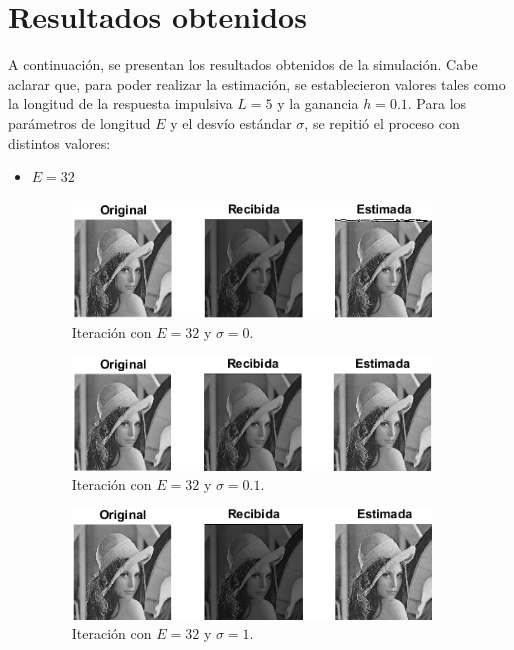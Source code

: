 \documentclass[a4paper]{article}
\begin{document}
\section{Resultados obtenidos} 
	A continuación, se presentan los resultados obtenidos de la simulación. Cabe aclarar que, para poder realizar la estimación, se establecieron valores tales como la longitud de la respuesta impulsiva $ L = 5 $ y la ganancia $ h = 0.1 $. Para los parámetros de longitud $ E $ y el desvío estándar $ \sigma $, se repitió el proceso con distintos valores:
\begin{itemize}
	
	\item $ E = 32 $
	\begin{figure}[H]
		\centering
		\includegraphics[width=0.9\textwidth]{E32S0.png}
		\caption{Iteración con $ E = 32 $ y $ \sigma = 0 $.}
	\end{figure}	
	\begin{figure}[H]
		\centering
		\includegraphics[width=0.9\textwidth]{E32S01.png}
		\caption{Iteración con $ E = 32 $ y $ \sigma = 0.1 $.}
	\end{figure}
	\begin{figure}[H]
		\centering	
		\includegraphics[width=0.9\textwidth]{E32S1.png}
		\caption{Iteración con $ E = 32 $ y $ \sigma = 1 $.}
	\end{figure}		

\end{itemize}
\end{document}

